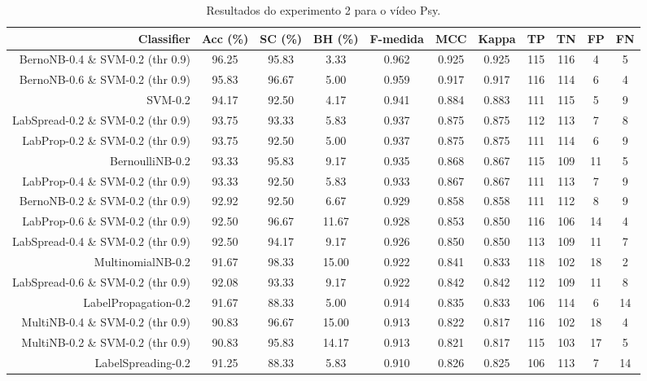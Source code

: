 \begin{table}[!htb]
\centering
\caption{Resultados do experimento 2 para o vídeo Psy.}
\label{tab:Psy}
\begin{tabular}{r|c|c|c|c|c|c|c|c|c|c}
\hline\hline
Classifier & Acc (\%) & SC (\%) & BH (\%) & F-medida & MCC & Kappa & TP & TN & FP & FN \\ \hline
BernoNB-0.4 \& SVM-0.2 (thr 0.9) & 96.25 & 95.83 & 3.33 & 0.962 & 0.925 & 0.925 & 115 & 116 & 4 & 5 \\ 
BernoNB-0.6 \& SVM-0.2 (thr 0.9) & 95.83 & 96.67 & 5.00 & 0.959 & 0.917 & 0.917 & 116 & 114 & 6 & 4 \\ 
SVM-0.2 & 94.17 & 92.50 & 4.17 & 0.941 & 0.884 & 0.883 & 111 & 115 & 5 & 9 \\ 
LabSpread-0.2 \& SVM-0.2 (thr 0.9) & 93.75 & 93.33 & 5.83 & 0.937 & 0.875 & 0.875 & 112 & 113 & 7 & 8 \\ 
LabProp-0.2 \& SVM-0.2 (thr 0.9) & 93.75 & 92.50 & 5.00 & 0.937 & 0.875 & 0.875 & 111 & 114 & 6 & 9 \\ 
BernoulliNB-0.2 & 93.33 & 95.83 & 9.17 & 0.935 & 0.868 & 0.867 & 115 & 109 & 11 & 5 \\ 
LabProp-0.4 \& SVM-0.2 (thr 0.9) & 93.33 & 92.50 & 5.83 & 0.933 & 0.867 & 0.867 & 111 & 113 & 7 & 9 \\ 
BernoNB-0.2 \& SVM-0.2 (thr 0.9) & 92.92 & 92.50 & 6.67 & 0.929 & 0.858 & 0.858 & 111 & 112 & 8 & 9 \\ 
LabProp-0.6 \& SVM-0.2 (thr 0.9) & 92.50 & 96.67 & 11.67 & 0.928 & 0.853 & 0.850 & 116 & 106 & 14 & 4 \\ 
LabSpread-0.4 \& SVM-0.2 (thr 0.9) & 92.50 & 94.17 & 9.17 & 0.926 & 0.850 & 0.850 & 113 & 109 & 11 & 7 \\ 
MultinomialNB-0.2 & 91.67 & 98.33 & 15.00 & 0.922 & 0.841 & 0.833 & 118 & 102 & 18 & 2 \\ 
LabSpread-0.6 \& SVM-0.2 (thr 0.9) & 92.08 & 93.33 & 9.17 & 0.922 & 0.842 & 0.842 & 112 & 109 & 11 & 8 \\ 
LabelPropagation-0.2 & 91.67 & 88.33 & 5.00 & 0.914 & 0.835 & 0.833 & 106 & 114 & 6 & 14 \\ 
MultiNB-0.4 \& SVM-0.2 (thr 0.9) & 90.83 & 96.67 & 15.00 & 0.913 & 0.822 & 0.817 & 116 & 102 & 18 & 4 \\ 
MultiNB-0.2 \& SVM-0.2 (thr 0.9) & 90.83 & 95.83 & 14.17 & 0.913 & 0.821 & 0.817 & 115 & 103 & 17 & 5 \\ 
LabelSpreading-0.2 & 91.25 & 88.33 & 5.83 & 0.910 & 0.826 & 0.825 & 106 & 113 & 7 & 14 \\ 

\end{tabular}
\end{table}

